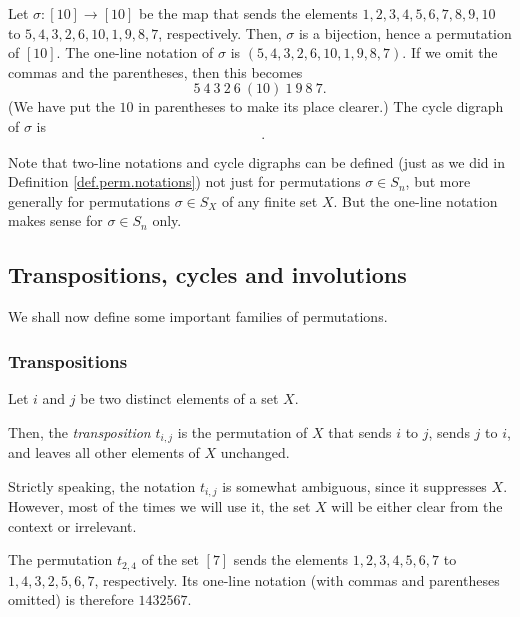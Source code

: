 \begin{example}
Let $\sigma:\left[  10\right]  \rightarrow\left[  10\right]  $ be the map that
sends the elements $1,2,3,4,5,6,7,8,9,10$ to $5,4,3,2,6,10,1,9,8,7$,
respectively. Then, $\sigma$ is a bijection, hence a permutation of $\left[
10\right]  $. The one-line notation of $\sigma$ is $\left(
5,4,3,2,6,10,1,9,8,7\right)  $. If we omit the commas and the parentheses,
then this becomes%
\[
5\ 4\ 3\ 2\ 6\ \left(  10\right)  \ 1\ 9\ 8\ 7.
\]
(We have put the $10$ in parentheses to make its place clearer.) The cycle
digraph of $\sigma$ is%
\[%
\ \ .
\]

\end{example}

Note that two-line notations and cycle digraphs can be defined (just as we did
in Definition \ref{def.perm.notations}) not just for permutations $\sigma\in
S_{n}$, but more generally for permutations $\sigma\in S_{X}$ of any finite
set $X$. But the one-line notation makes sense for $\sigma\in S_{n}$ only.


\subsection{Transpositions, cycles and involutions}

We shall now define some important families of permutations.

\subsubsection{Transpositions}

\begin{definition}
\label{def.perm.tij}Let $i$ and $j$ be two distinct elements of a set $X$.

Then, the \emph{transposition} $t_{i,j}$ is the permutation of $X$ that sends
$i$ to $j$, sends $j$ to $i$, and leaves all other elements of $X$ unchanged.
\end{definition}

Strictly speaking, the notation $t_{i,j}$ is somewhat ambiguous, since it
suppresses $X$. However, most of the times we will use it, the set $X$ will be
either clear from the context or irrelevant.

\begin{example}
The permutation $t_{2,4}$ of the set $\left[  7\right]  $ sends the elements
$1,2,3,4,5,6,7$ to $1,4,3,2,5,6,7$, respectively. Its one-line notation (with
commas and parentheses omitted) is therefore $1432567$.
\end{example}

